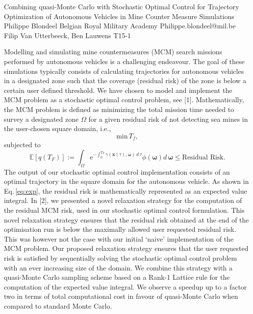\begin{talk}
  {Combining quasi-Monte Carlo with Stochastic Optimal Control for Trajectory Optimization of Autonomous Vehicles in Mine Counter Measure Simulations}%
  {Philippe Blondeel}%
  {Belgian Royal Military Academy}%
  {Philippe.blondeel@mil.be}%
  {Filip Van Utterbeeck, Ben Lauwens}%
  {T15-1}%
			
Modelling and simulating mine countermeasures (MCM) search missions performed by autonomous vehicles is a challenging endeavour. The goal of these simulations typically consists of calculating trajectories for autonomous vehicles in a designated zone such that the coverage (residual risk) of the zone is below a certain user defined threshold. We have chosen to model and implement the MCM problem as a stochastic optimal control problem, see [1]. Mathematically, the MCM problem is defined as minimizing the total mission time needed to survey a designated zone $\Omega$ for a given residual risk of not detecting sea mines in the  user-chosen square  domain, i.e., 
\begin{equation}
\text{min}\, T_f,
\label{eq:min}
\end{equation}
subjected to
\begin{equation}
 \mathbb{E}[q\left(T_F\right)] :=  \int_\Omega \text{e}^{-\int_0^{T_F} \gamma\left(\bm{x}\left(\tau\right),\bm{\omega}\right)\, d\,\tau}\phi\left(\bm{\omega}\right) d\,\bm{\omega} \leq \text{Residual Risk}.
\label{eq:exp}
\end{equation}
The output of our stochastic optimal control implementation consists of an optimal trajectory in the square domain for the autonomous vehicle.  As shown in Eq.\,\eqref{eq:exp}, the residual risk is mathematically represented as an expected value integral. In [2], we presented a novel relaxation strategy for the computation of the residual MCM risk, used in our stochastic optimal control formulation. This novel relaxation strategy ensures that the  residual risk obtained at the end of the optimisation run is below the maximally allowed user requested residual risk. This was however not the case  with our initial `naive' implementation of the MCM problem. Our proposed relaxation strategy ensures that the user requested risk is satisfied by sequentially solving the stochastic optimal control problem with an ever increasing size of the domain. We combine this strategy with  a quasi-Monte Carlo  sampling scheme based on a Rank-1 Lattice rule for the computation of the expected value integral. We observe a speedup up to a factor two in terms of total computational cost in favour of quasi-Monte Carlo when compared to standard Monte Carlo.



\end{talk}
